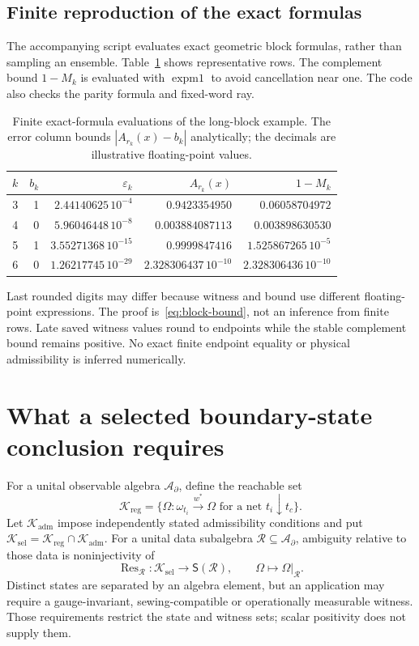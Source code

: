 \documentclass[11pt]{article}
\theoremstyle{definition}
\newcommand{\A}{\mathcal A}
\newcommand{\K}{\mathcal K}
\newcommand{\eps}{\varepsilon}
\DeclareMathOperator{\Res}{Res}
\begin{document}
\subsection{Finite reproduction of the exact formulas}

The accompanying script evaluates exact geometric block formulas, rather than sampling an ensemble.
Table~\ref{tab:blocks} shows representative rows.
The complement bound $1-M_k$ is evaluated with $\operatorname{expm1}$ to avoid cancellation near one.
The code also checks the parity formula and fixed-word ray.

\begin{table}[htbp]
\centering
\caption{Finite exact-formula evaluations of the long-block example.
The error column bounds $|A_{r_k}(x)-b_k|$ analytically; the decimals are illustrative floating-point values.}
\label{tab:blocks}
\begin{tabular}{rrrrr}
\toprule
$k$ & $b_k$ & $\eps_k$ & $A_{r_k}(x)$ & $1-M_k$\\
\midrule
3 & 1 & $2.44140625\,10^{-4}$ & $0.9423354950$ & $0.06058704972$\\
4 & 0 & $5.96046448\,10^{-8}$ & $0.003884087113$ & $0.003898630530$\\
5 & 1 & $3.55271368\,10^{-15}$ & $0.9999847416$ & $1.525867265\,10^{-5}$\\
6 & 0 & $1.26217745\,10^{-29}$ & $2.328306437\,10^{-10}$ & $2.328306436\,10^{-10}$\\
\bottomrule
\end{tabular}
\end{table}

Last rounded digits may differ because witness and bound use different floating-point expressions.
The proof is~\eqref{eq:block-bound}, not an inference from finite rows.
Late saved witness values round to endpoints while the stable complement bound remains positive.
No exact finite endpoint equality or physical admissibility is inferred numerically.

\section{What a selected boundary-state conclusion requires}

For a unital observable algebra $\A_\partial$, define the reachable set
\begin{equation}
 \K_{\mathrm{reg}}=
 \{\Omega:\omega_{t_i}\xrightarrow{w^*}\Omega
       \text{ for a net }t_i\downarrow t_c\}.
\end{equation}
Let $\K_{\mathrm{adm}}$ impose independently stated admissibility conditions and put
$\K_{\mathrm{sel}}=\K_{\mathrm{reg}}\cap\K_{\mathrm{adm}}$.
For a unital data subalgebra $\mathcal R\subseteq\A_\partial$, ambiguity relative to those data is noninjectivity of
\begin{equation}
 \Res_{\mathcal R}:\K_{\mathrm{sel}}\to\mathsf S(\mathcal R),
 \qquad \Omega\mapsto\Omega|_{\mathcal R}.
\end{equation}
Distinct states are separated by an algebra element, but an application may require a gauge-invariant, sewing-compatible or operationally measurable witness.
Those requirements restrict the state and witness sets; scalar positivity does not supply them.
\end{document}

